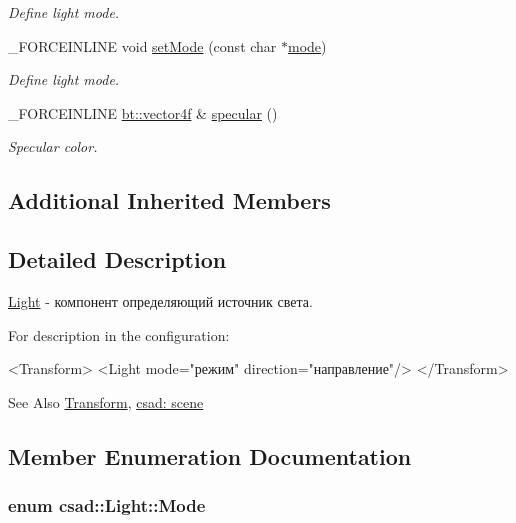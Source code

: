 \begin{DoxyCompactItemize}
\begin{DoxyCompactList}\small\item\em Define light mode. \end{DoxyCompactList}\item 
\hypertarget{classcsad_1_1_light_a7df301de1fa1a05fa2e98751cdf6db2a}{\-\_\-\-F\-O\-R\-C\-E\-I\-N\-L\-I\-N\-E void \hyperlink{classcsad_1_1_light_a7df301de1fa1a05fa2e98751cdf6db2a}{set\-Mode} (const char $\ast$\hyperlink{classcsad_1_1_light_a4fc5e4e222d852a082cb32dddcab3c8b}{mode})}\label{classcsad_1_1_light_a7df301de1fa1a05fa2e98751cdf6db2a}

\begin{DoxyCompactList}\small\item\em Define light mode. \end{DoxyCompactList}\item 
\hypertarget{classcsad_1_1_light_a51da73272c28947c6367c8e1f0f7a4d3}{\-\_\-\-F\-O\-R\-C\-E\-I\-N\-L\-I\-N\-E \hyperlink{classbt_1_1vector4f}{bt\-::vector4f} \& \hyperlink{classcsad_1_1_light_a51da73272c28947c6367c8e1f0f7a4d3}{specular} ()}\label{classcsad_1_1_light_a51da73272c28947c6367c8e1f0f7a4d3}

\begin{DoxyCompactList}\small\item\em Specular color. \end{DoxyCompactList}\end{DoxyCompactItemize}
\subsection*{Additional Inherited Members}


\subsection{Detailed Description}
\hyperlink{classcsad_1_1_light}{Light} -\/ компонент определяющий источник света. 

For description in the configuration\-: \begin{DoxyVerb}  <Transform>
     <Light mode="режим" direction="направление"/>
  </Transform>
\end{DoxyVerb}


\begin{DoxySeeAlso}{See Also}
\hyperlink{classcsad_1_1_transform}{Transform}, \hyperlink{group__scene}{csad\-: scene} 
\end{DoxySeeAlso}


\subsection{Member Enumeration Documentation}
\hypertarget{classcsad_1_1_light_a00ff745cbb2a56fa7920b53acc068bf9}{
\subsubsection[{Mode}]{\setlength{\rightskip}{0pt plus 5cm}enum {\bf csad\-::\-Light\-::\-Mode}}}\label{classcsad_1_1_light_a00ff745cbb2a56fa7920b53acc068bf9}


